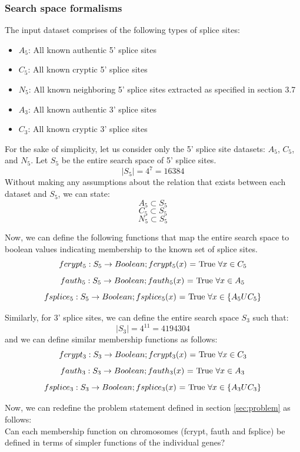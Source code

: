 \documentclass[12pt,a4paper]{article}
\begin{document}
    \subsubsection{Search space formalisms}
	The input dataset comprises of the following types of splice sites:
	\begin{itemize}
		\item $A_5$: All known authentic 5’ splice sites
		\item $C_5$: All known cryptic 5’ splice sites
		\item $N_5$: All known neighboring 5' splice sites extracted as specified in section 3.7
		\item $A_3$: All known authentic 3’ splice sites
		\item $C_3$: All known cryptic 3’ splice sites		
	\end{itemize}
			
	For the sake of simplicity, let us consider only the 5' splice site datasets: $A_5$, $C_5$, and $N_5$.
	Let $S_5$ be the entire search space of 5' splice sites.
	$$|S_5| = 4^7 = 16384$$
	Without making any assumptions about the relation that exists between each dataset and $S_5$, we can state: 
	$$ A_5 \subset S_5 $$ 
	$$ C_5 \subset S_5 $$
	$$ N_5 \subset S_5 $$

	Now, we can define the following functions that map the entire search space to boolean values indicating membership to the known set of splice sites.
	$$ fcrypt_5:  S_5 \rightarrow Boolean; fcrypt_5(x)\textnormal{ = True  }\forall x \in C_5 $$
	$$ fauth_5: S_5 \rightarrow Boolean; fauth_5(x)\textnormal{ = True  }\forall x \in A_5 $$
	$$ fsplice_5: S_5 \rightarrow Boolean; fsplice_5(x)\textnormal{ = True  }\forall x \in \{A_5 U C_5\} $$
	
	Similarly, for 3’ splice sites, we can define the entire search space $S_3$ such that:
	$$ |S_3| = 4^{11} = 4194304 $$
	and we can define similar membership functions as follows:
	$$ fcrypt_3:  S_3 \rightarrow Boolean; fcrypt_3(x)\textnormal{ = True  }\forall x \in C_3 $$
	$$ fauth_3: S_3 \rightarrow Boolean; fauth_3(x)\textnormal{ = True  }\forall x \in A_3 $$
	$$ fsplice_3: S_3 \rightarrow Boolean; fsplice_3(x)\textnormal{ = True  }\forall x \in \{A_3 U C_3\} $$
	
	Now, we can redefine the problem statement defined in section \ref{sec:problem} as follows:\\
	Can each membership function on chromosomes (fcrypt, fauth and fsplice) be defined in terms of simpler functions of the individual genes? \par
	
\end{document}
